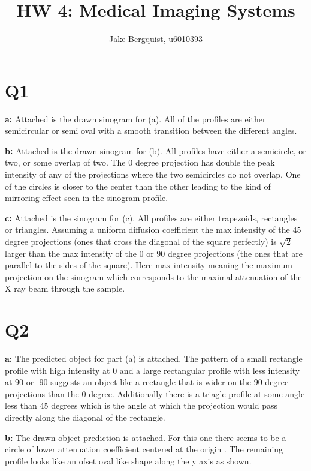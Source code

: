 \documentclass[12pt]{article}
\begin{document}
\title{HW 4: Medical Imaging Systems}
\author{Jake Bergquist, u6010393 }
\maketitle

\section{Q1}
\noindent\textbf{a: } 
Attached is the drawn sinogram for (a). All of the profiles are either semicircular or semi oval with a smooth transition between the different angles.

\noindent\textbf{b: } 
Attached is the drawn sinogram for (b). All profiles have either a semicircle, or two, or some overlap of two. The 0 degree projection has double the peak intensity of any of the projections where the two semicircles do not overlap. One of the circles is closer to the center than the other leading to the kind of mirroring effect seen in the sinogram profile.

\noindent\textbf{c: }
Attached is the sinogram for (c). All profiles are either trapezoids, rectangles or triangles. Assuming a uniform diffusion coefficient the max intensity of the 45 degree projections (ones that cross the diagonal of the square perfectly) is $\sqrt{2}$ larger than the max intensity of the 0 or 90 degree projections (the ones that are parallel to the sides of the square). Here max intensity meaning the maximum projection on the sinogram which corresponds to the maximal attenuation of the X ray beam through the sample.

\section{Q2}
\noindent\textbf{a: } 
The predicted object for part (a) is attached. The pattern of a small rectangle profile with high intensity at 0 and a large rectangular profile with less intensity at 90 or -90 suggests an object like a rectangle that is wider on the 90 degree projections than the 0 degree. Additionally there is a triagle profile at some angle less than 45 degrees which is the angle at which the projection would pass directly along the diagonal of the rectangle.

\noindent\textbf{b: }
The drawn object prediction is attached. For this one there seems to be a circle of lower attenuation coefficient centered at the origin . The remaining profile looks like an ofset oval like shape along the y axis as shown.
\end{document}

